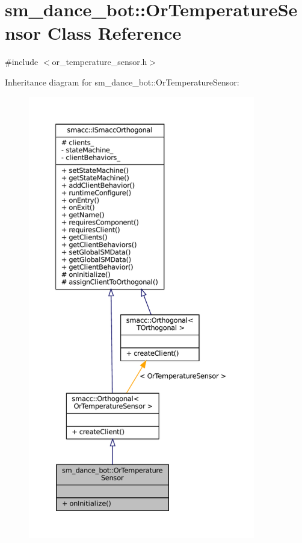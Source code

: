 \hypertarget{classsm__dance__bot_1_1OrTemperatureSensor}{}\section{sm\+\_\+dance\+\_\+bot\+:\+:Or\+Temperature\+Sensor Class Reference}
\label{classsm__dance__bot_1_1OrTemperatureSensor}


{\ttfamily \#include $<$or\+\_\+temperature\+\_\+sensor.\+h$>$}



Inheritance diagram for sm\+\_\+dance\+\_\+bot\+:\+:Or\+Temperature\+Sensor\+:
\nopagebreak
\begin{figure}[H]
\begin{center}
\leavevmode
\includegraphics[height=550pt]{classsm__dance__bot_1_1OrTemperatureSensor__inherit__graph}
\end{center}
\end{figure}


